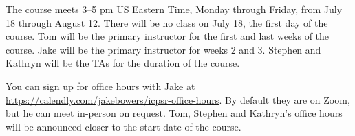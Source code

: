 The course meets 3--5 pm US Eastern Time, Monday through Friday, from July 18
through August 12. There will be no class on July 18, the first day of the
course. Tom will be the primary instructor for the first and last weeks of the
course. Jake will be the primary instructor for weeks 2 and 3. Stephen and
Kathryn will be the TAs for the duration of the course.

You can sign up for office hours with Jake at
\href{Calendly}{https://calendly.com/jakebowers/icpsr-office-hours}. By default
they are on Zoom, but he can meet in-person on request. Tom,
Stephen and Kathryn's office hours will be announced closer to the start date of
the course.


